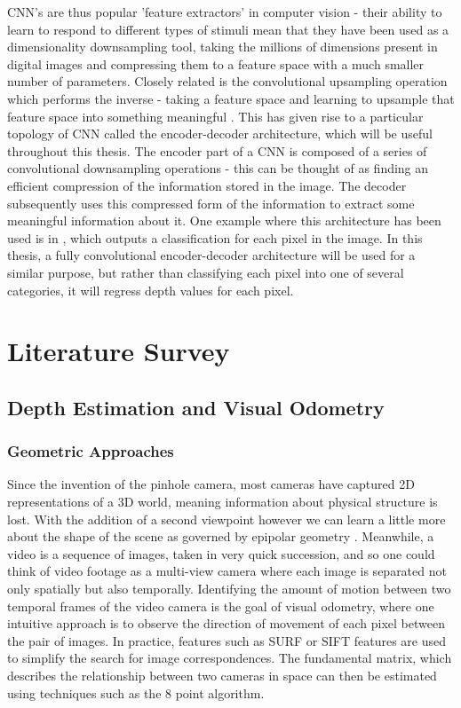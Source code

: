 \documentclass[openany]{book}
\begin{document}
CNN's are thus popular 'feature extractors' in computer vision - their ability to learn to respond to different types of stimuli mean that they have been used as a dimensionality downsampling tool, taking the millions of dimensions present in digital images  and compressing them to a feature space with a much smaller number of parameters. Closely related is the convolutional upsampling operation which performs the inverse - taking a feature space and learning to upsample that feature space into something meaningful \cite{long2014fcn}. This has given rise to a particular topology of CNN called the encoder-decoder architecture, which will be useful throughout this thesis. The encoder part of a CNN is composed of a series of convolutional downsampling operations - this can be thought of as finding an efficient compression of the information stored in the image. The decoder subsequently uses this compressed form of the information to extract some meaningful information about it. One example where this architecture has been used is in \cite{long2014fcn}, which outputs a classification for each pixel in the image. In this thesis, a fully convolutional encoder-decoder architecture will be used for a similar purpose, but rather than classifying each pixel into one of several categories, it will regress depth values for each pixel. 

\chapter{Literature Survey}


\section{Depth Estimation and Visual Odometry}

\subsection{Geometric Approaches}

Since the invention of the pinhole camera, most cameras have captured 2D representations of a 3D world, meaning information about physical structure is lost. With the addition of a second viewpoint however we can learn a little more about the shape of the scene as governed by epipolar geometry \cite{zisserman2004multiview}. Meanwhile, a video is a sequence of images, taken in very quick succession, and so one could think of video footage as a multi-view camera where each image is separated not only spatially but also temporally. Identifying the amount of motion between two temporal frames of the video camera is the goal of visual odometry, where one intuitive approach is to observe the direction of movement of each pixel between the pair of images. In practice, features such as SURF \cite{bay2008surf} or SIFT \cite{lowe2004sift} features are used to simplify the search for image correspondences. The fundamental matrix, which describes the relationship between two cameras in space can then be estimated using techniques such as the 8 point algorithm. 
\end{document}
